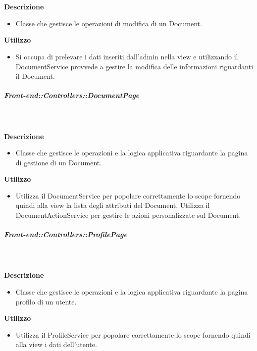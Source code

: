         \textbf{\\ \\ Descrizione} 
          \begin{itemize}
            \item[] Classe che gestisce le operazioni di modifica di un Document.
          \end{itemize}      
        \textbf{Utilizzo}  
          \begin{itemize}
            \item[] Si occupa di prelevare i dati inseriti dall'admin nella view e utilizzando il DocumentService provvede a gestire la modifica delle informazioni riguardanti il Document.
          \end{itemize}
      \subparagraph{Front-end::Controllers::DocumentPage}
        
        \textbf{\\ \\ Descrizione} 
          \begin{itemize}
            \item[] Classe che gestisce le operazioni e la logica applicativa riguardante la pagina di gestione di un Document.
          \end{itemize}      
        \textbf{Utilizzo}  
          \begin{itemize}
            \item[] Utilizza il DocumentService per popolare correttamente lo scope fornendo quindi alla view la lista degli attributi del Document. \newline
Utilizza il DocumentActionService per gestire le azioni personalizzate sul Document.
          \end{itemize}
      \subparagraph{Front-end::Controllers::ProfilePage}
        
        \textbf{\\ \\ Descrizione} 
          \begin{itemize}
            \item[] Classe che gestisce le operazioni e la logica applicativa riguardante la pagina profilo di un utente.
          \end{itemize}      
        \textbf{Utilizzo}  
          \begin{itemize}
            \item[] Utilizza il ProfileService per popolare correttamente lo scope fornendo quindi alla view i dati dell'utente.
          \end{itemize}
